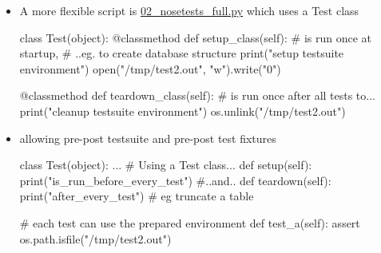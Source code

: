 \begin{pyframe}{}
\begin{itemize}
\item A more flexible script is \href{https://github.com/ioggstream/python-course/blob/master/python-for-sysadmin/02\_nosetests\_full.py}{02\_nosetests\_full.py}
which uses a Test class
\begin{pycode}
class Test(object):
  @classmethod
  def setup_class(self): # is run once at startup,
    # ..eg. to create database structure
    print("setup testsuite environment")
    open("/tmp/test2.out", "w").write("0")

  @classmethod
  def teardown_class(self): # is run once after all tests to...
    print("cleanup testsuite environment")
    os.unlink("/tmp/test2.out")


\end{pycode}
\end{itemize}
\end{pyframe}

\begin{pyframe}{}
\begin{itemize}
\item allowing pre-post testsuite and pre-post test fixtures
\begin{pycode}
class Test(object):
  ...
  # Using a Test class...
  def setup(self):
    print("is_run_before_every_test") #..and..
  def teardown(self):
    print("after_every_test") # eg truncate a table

  # each test can use the prepared environment
  def test_a(self):
    assert os.path.isfile("/tmp/test2.out")

\end{pycode}
\end{itemize}
\end{pyframe}
